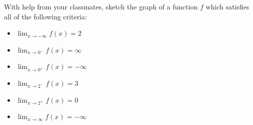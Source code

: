 \documentclass{ximera}
\begin{document}
\begin{problem}
With help from your classmates, sketch  the graph of a function $f$  which satisfies all of the following criteria:

\begin{itemize}

\item $\lim_{x \rightarrow -\infty} f(x) = 2$

\item $\lim_{x \rightarrow 0^{-}} f(x) = \infty$

\item $\lim_{x \rightarrow 0^{+}} f(x) = -\infty$

\item $\lim_{x \rightarrow 2^{-}} f(x) = 3$

\item $\lim_{x \rightarrow 2^{+}} f(x) =0$

\item $\lim_{x \rightarrow \infty} f(x) = -\infty$

\end{itemize}

\end{problem}
\end{document}
